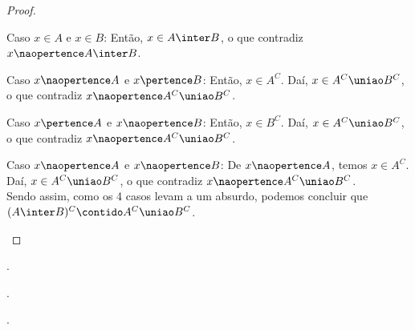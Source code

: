 \begin{proof}
\begin{enumerate}
\begin{enumerate}
				Caso $x \in A$ e $x \in B$: Então, $x \in A \inter B$, o que contradiz $x \naopertence A \inter B$.

				Caso $x \naopertence A$ e $x \pertence B$: Então, $x \in A^C$. Daí, $x \in A^C \uniao B^C$, o que contradiz $x \naopertence A^C \uniao B^C$.

				Caso $x \pertence A$ e $x \naopertence B$: Então, $x \in B^C$. Daí, $x \in A^C \uniao B^C$, o que contradiz $x \naopertence A^C \uniao B^C$.

				Caso $x \naopertence A$ e $x \naopertence B$: De $x \naopertence A$, temos $x \in A^C$. Daí, $x \in A^C \uniao B^C$, o que contradiz $x \naopertence A^C \uniao B^C$.\\
				Sendo assim, como os 4 casos levam a um absurdo, podemos concluir que $(A \inter B)^C \contido A^C \uniao B^C$.
			\end{enumerate}	
	\end{enumerate}
\end{proof}


\begin{tve}
	.
\end{tve}
\begin{tve}
	.
\end{tve}
\begin{tve}
	.
\end{tve}

